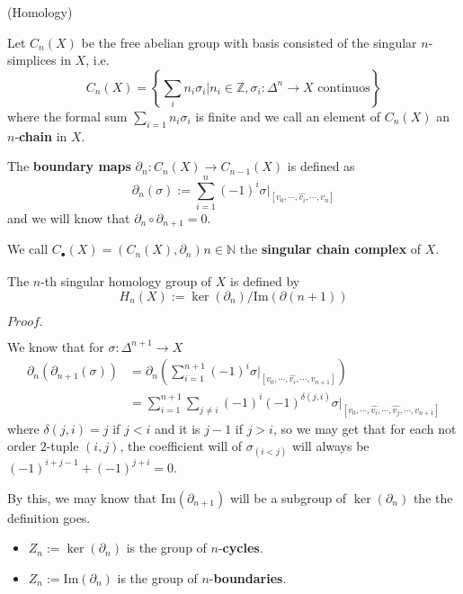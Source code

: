 \documentclass{article}
\newcommand{\Pf}[1]{$Proof.$\par}
\begin{document}
\begin{definition}(Homology)\par
    Let $C_n(X)$ be the free abelian group with basis consisted of the singular $n$-simplices in $X$, i.e.
    \[C_n(X) = \left\{\sum\limits_{i} n_i \sigma_i| n_i\in \mathbb{Z}, \sigma_i: \Delta^n \to X\text{ continuos}\right\}\]
    where the formal sum $\sum\limits_{i=1}n_i\sigma_i$ is finite and we call an element of $C_n(X)$ an $n$-\textbf{chain} in $X$.\par
    The \textbf{boundary maps} $\partial_n: C_n(X) \to C_{n-1}(X)$ is defined as
    \[
    \partial_n(\sigma) := \sum\limits_{i=1}^n (-1)^i \sigma|_{[v_0,\cdots,\hat{v_i},\cdots,v_n]}
    \]
    and we will know that $\partial_n\circ \partial_{n+1} = 0$.\par
    We call $C_{\bullet}(X) = (C_n(X),\partial_n)_{}n\in\mathbb{N}$ the \textbf{singular chain complex} of $X$.\par
    The $n$-th singular homology group of $X$ is defined by
    \[H_n(X):=\ker(\partial_n)/\text{Im}(\partial(n+1))\]
\end{definition}
\Pf\par
    We know that for $\sigma:\Delta^{n+1}\to X$
    \[
    \begin{aligned}
    \partial_n(\partial_{n+1}(\sigma)) &= \partial_n\left(\sum\limits_{i=1}^{n+1}(-1)^i \sigma|_{[v_0,\cdots,\hat{v_i},\cdots,v_{n+1}]}\right) \\
    &= \sum\limits_{i=1}^{n+1}\sum\limits_{j\neq i}(-1)^i (-1)^{\delta(j,i)}\sigma|_{[v_0,\cdots,\hat{v_i},\cdots,\hat{v_j},\cdots,v_{n+1}]} 
    \end{aligned}
    \]
    where $\delta(j,i) = j$ if $j<i$ and it is $j-1$ if $j>i$, so we may get that for each not order $2$-tuple $(i,j)$, the coefficient will of $\sigma_{(i<j)}$ will always be $(-1)^{i+j-1}+(-1)^{j+i} = 0$.\par
    By this, we may know that $\text{Im}(\partial_{n+1})$ will be a subgroup of $\ker(\partial_n)$ the the definition goes.

\begin{definition}
    \begin{itemize}
        \item $Z_n:=\ker(\partial_n)$ is the group of $n$-\textbf{cycles}.
        \item $Z_n:=\text{Im}(\partial_n)$ is the group of $n$-\textbf{boundaries}.
    \end{itemize}
\end{definition}
    
\end{document}
